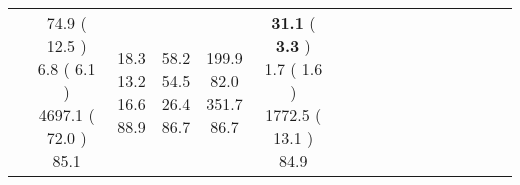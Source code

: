 \documentclass[9pt]{article}
\begin{document}
\begin{landscape}
\begin{longtable}{ l | c c c c | c c c c | c c c c | c c c c |}
 &
                    
                            \makecell{              74.9
     (             12.5
    ) \\
            {\footnotesize             6.8
     (              6.1
     )} \\
            {\footnotesize             4697.1
     (            72.0
    ) } \\
            {\small  \textcolor[rgb]{ 0.498 , 0.403 , 0.1} {85.1  }
} }


             &
                            \makecell{              18.3
     \\
            {\footnotesize             13.2
    } \\  {\footnotesize             16.6
     } \\
            {\small \textcolor[rgb]{ 0.422 , 0.478 , 0.1} {88.9  }
} }
             &                         \makecell{              58.2
     \\
            {\footnotesize             54.5
    } \\  {\footnotesize             26.4
     } \\
            {\small \textcolor[rgb]{ 0.466 , 0.434 , 0.1} {86.7  }
} }
             &
                            \makecell{              199.9
     \\
            {\footnotesize             82.0
    } \\  {\footnotesize             351.7
     } \\
            {\small \textcolor[rgb]{ 0.466 , 0.434 , 0.1} {86.7  }
} }
            

 & 
                            \makecell{              \textbf{ 31.1 }
     (             \textbf{ 3.3 }
    ) \\
            {\footnotesize             1.7
     (              1.6
     )} \\
            {\footnotesize             1772.5
     (            13.1
    ) } \\
            {\small  \textcolor[rgb]{ 0.502 , 0.398 , 0.1} {84.9  }
} }



\end{longtable}
\end{landscape}
\end{document}

